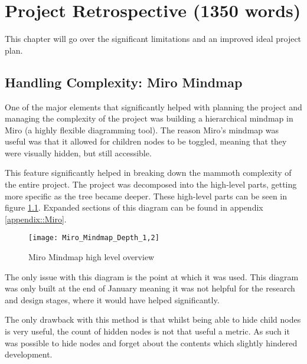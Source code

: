 \chapter{Project Retrospective (1350 words)}
This chapter will go over the significant limitations and an improved ideal project plan.

\section{Handling Complexity: Miro Mindmap}
One of the major elements that significantly helped with planning the project and managing the complexity of the project was building a hierarchical mindmap in Miro (a highly flexible diagramming tool). The reason Miro's mindmap was useful was that it allowed for children nodes to be toggled, meaning that they were visually hidden, but still accessible.

This feature significantly helped in breaking down the mammoth complexity of the entire project. The project was decomposed into the high-level parts, getting more specific as the tree became deeper. These high-level parts can be seen in figure \ref{figure::miro::mindmap_high_level}. Expanded sections of this diagram can be found in appendix \ref{appendix::Miro}.
\begin{figure}
    \texttt{[image: Miro\_Mindmap\_Depth\_1,2]}
    \caption{Miro Mindmap high level overview}
    \label{figure::miro::mindmap_high_level}
\end{figure}

The only issue with this diagram is the point at which it was used. This diagram was only built at the end of January meaning it was not helpful for the research and design stages, where it would have helped significantly.

The only drawback with this method is that whilst being able to hide child nodes is very useful, the count of hidden nodes is not that useful a metric. As such it was possible to hide nodes and forget about the contents which slightly hindered development.

